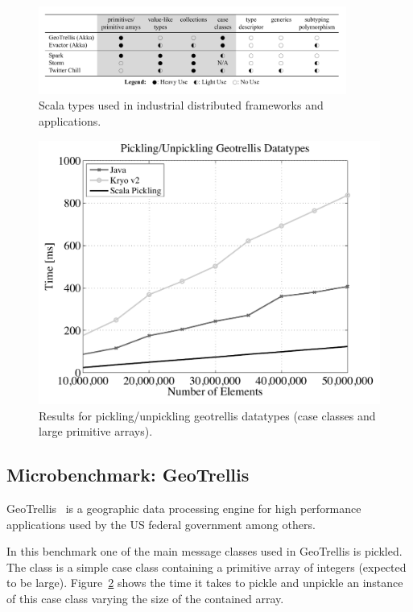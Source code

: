 \documentclass[10pt]{sigplanconf}
\theoremstyle{definition}
\theoremstyle{definition}
\begin{document}
\begin{figure}[ht!]
 \centering
 \includegraphics[width=0.9\textwidth]{application-table.pdf}
 \vspace{-1em}
 \caption{Scala types used in industrial distributed frameworks and applications.}
 \label{fig:application-table}
\end{figure}

\begin{figure}[ht!]
 \centering
 \includegraphics[width=\columnwidth]{geotrellis.pdf}
 \caption{Results for pickling/unpickling geotrellis datatypes (case classes and large primitive arrays).}
 \label{fig:geotrellis}
\end{figure}

\subsection{Microbenchmark: GeoTrellis}

GeoTrellis~\cite{GeoTrellis} is a geographic data processing engine for high performance applications used by the US federal government among others.

In this benchmark one of the main message classes used in GeoTrellis is pickled. The class is a simple case class containing a primitive array of integers (expected to be large). Figure~\ref{fig:geotrellis} shows the time it takes to pickle and unpickle an instance of this case class varying the size of the contained array.
\end{document}
